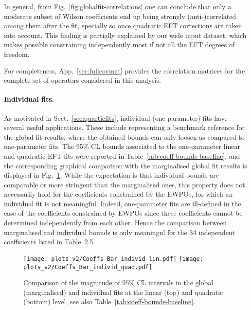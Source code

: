 In general, from Fig.~\ref{fig:globalfit-correlations} one can
conclude that only a moderate subset of Wilson coefficients end
up being strongly (anti-)correlated
among them after the fit, specially so once quadratic EFT corrections are taken into account.
%
This finding is partially explained by our wide input dataset,
which makes possible constraining independently most if not all
the EFT degrees of freedom.

{  For completeness, App.~\ref{sec:fullcovmat}
  provides the
  correlation matrices for the complete set of operators
considered in this analysis.}


\paragraph{Individual fits.}
%
As motivated in Sect.~\ref{sec:quarticfits}, individual
(one-parameter) fits have several useful applications.
%
These include representing a benchmark reference for the global fit
results, where the obtained bounds can only loosen as compared
to one-parameter fits.
%
The 95\% CL bounds associated to the one-parameter linear and quadratic EFT
fits were reported in Table~\ref{tab:coeff-bounds-baseline},
and the corresponding graphical comparison with the marginalised
global fit results is displayed in
Fig.~\ref{fig:globalfit-baseline-bounds-lin-NS-ind-vs-marg}.
%
{  While the expectation is that individual bounds
are comparable or more stringent than the marginalised ones, }
this property does not necessarily hold for the coefficients
constrained by the EWPOs, for which an individual fit is not meaningful.
%
{  Indeed, one-parameter fits are ill-defined in
  the case of the coefficients constrained by EWPOs since
  these coefficients cannot be determined independently from each other.
  Hence the comparison between marginalised and individual bounds
  is only meaningul for the 34 independent coefficients listed
  in Table~2.5.
}

\begin{figure}[t]
  \begin{center}
    \texttt{[image: plots\_v2/Coeffs\_Bar\_individ\_lin.pdf]}
    \texttt{[image: plots\_v2/Coeffs\_Bar\_individ\_quad.pdf]}
    \vspace{-0.4cm}
    \caption{\small Comparison of the magnitude of 95\% CL intervals in the global
      (marginalised) and individual fits at the linear (top) and quadratic
      (bottom) level, see also Table~\ref{tab:coeff-bounds-baseline}.
     \label{fig:globalfit-baseline-bounds-lin-NS-ind-vs-marg} }
  \end{center}
\end{figure}

